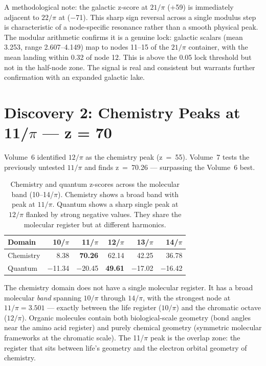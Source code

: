 \documentclass[11pt, letterpaper, openany]{book}
\begin{document}
A methodological note: the galactic z-score at $21/\pi$ (+59) is immediately adjacent
to $22/\pi$ at ($-$71). This sharp sign reversal across a single modulus step is
characteristic of a node-specific resonance rather than a smooth physical peak. The
modular arithmetic confirms it is a genuine lock: galactic scalars (mean 3.253, range
2.607--4.149) map to nodes 11--15 of the $21/\pi$ container, with the mean landing
within 0.32 of node 12. This is above the 0.05 lock threshold but not in the
half-node zone. The signal is real and consistent but warrants further confirmation
with an expanded galactic lake.

\section*{Discovery 2: Chemistry Peaks at 11/$\pi$ — z = 70}

Volume~6 identified $12/\pi$ as the chemistry peak (z~=~55). Volume~7 tests the
previously untested $11/\pi$ and finds z~=~70.26 --- surpassing the Volume~6 best.

\begin{table}[H]
\centering
\renewcommand{\arraystretch}{1.3}
\begin{tabular}{|l|r|r|r|r|r|}
\hline
\textbf{Domain} & \textbf{10/$\pi$} & \textbf{11/$\pi$} & \textbf{12/$\pi$} & \textbf{13/$\pi$} & \textbf{14/$\pi$} \\
\hline\hline
Chemistry & 8.38 & \textbf{70.26} & 62.14 & 42.25 & 36.78 \\
Quantum   & $-$11.34 & $-$20.45 & \textbf{49.61} & $-$17.02 & $-$16.42 \\
\hline
\end{tabular}
\caption{Chemistry and quantum z-scores across the molecular band (10--14/$\pi$). Chemistry
shows a broad band with peak at $11/\pi$. Quantum shows a sharp single peak at $12/\pi$
flanked by strong negative values. They share the molecular register but at different harmonics.}
\label{tab:molecular_band}
\end{table}

The chemistry domain does not have a single molecular register. It has a broad molecular
\emph{band} spanning $10/\pi$ through $14/\pi$, with the strongest node at $11/\pi =
3.501$ --- exactly between the life register ($10/\pi$) and the chromatic octave
($12/\pi$). Organic molecules contain both biological-scale geometry (bond angles near
the amino acid register) and purely chemical geometry (symmetric molecular frameworks
at the chromatic scale). The 11/$\pi$ peak is the overlap zone: the register that sits
between life's geometry and the electron orbital geometry of chemistry.
\end{document}
